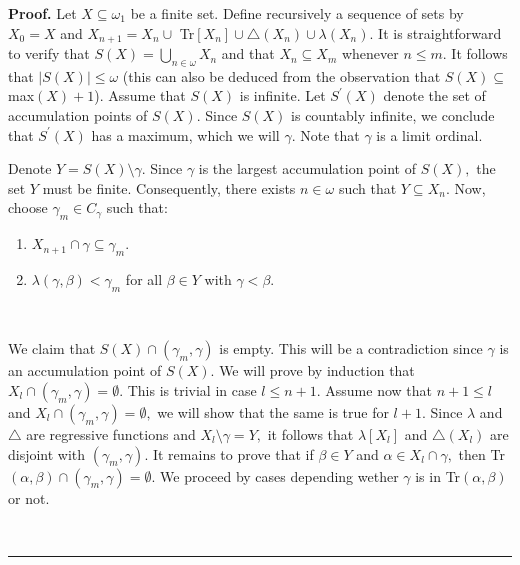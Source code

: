 \documentclass{article}
\newenvironment{proof}[1][Proof]{\noindent\textbf{#1.} }{\ \rule{0.5em}{0.5em}}
\begin{document}
\begin{proof}
Let $X\subseteq\omega_{1}$ be a finite set. Define recursively a sequence of
sets by $X_{0}=X$ and $X_{n+1}=X_{n}\cup$ \textsf{Tr}$\left[  X_{n}\right]
\cup\triangle\left(  X_{n}\right)  \cup\lambda\left(  X_{n}\right)  .$ It is
straightforward to verify that $S\left(  X\right)  =\bigcup\limits_{n\in
\omega}X_{n}$ and that $X_{n}\subseteq X_{m}$ whenever $n\leq m.$ It follows
that $\left\vert S\left(  X\right)  \right\vert \leq\omega$ (this can also be
deduced from the observation that $S\left(  X\right)  \subseteq$
\textsf{max}$\left(  X\right)  +1$). Assume that $S\left(  X\right)  $ is
infinite. Let $S^{\prime}\left(  X\right)  $ denote the set of accumulation
points of $S\left(  X\right)  .$ Since $S\left(  X\right)  $ is countably
infinite, we conclude that $S^{\prime}\left(  X\right)  $ has a maximum, which
we will $\gamma.$ Note that $\gamma$ is a limit ordinal.

\qquad\qquad\qquad\qquad

Denote $Y=S\left(  X\right)  \setminus\gamma.$ Since $\gamma$ is the largest
accumulation point of $S\left(  X\right)  ,$ the set $Y$ must be finite.
Consequently, there exists $n\in\omega$ such that $Y\subseteq X_{n}.$ Now,
choose $\gamma_{m}\in C_{\gamma}$ such that:

\begin{enumerate}
\item $X_{n+1}\cap\gamma\subseteq\gamma_{m}.$

\item $\lambda\left(  \gamma,\beta\right)  <\gamma_{m}$ for all $\beta\in Y$
with $\gamma<\beta.$
\end{enumerate}

\qquad\ \ \qquad\ \ 

We claim that $S\left(  X\right)  \cap\left(  \gamma_{m},\gamma\right)  $ is
empty. This will be a contradiction since $\gamma$ is an accumulation point of
$S\left(  X\right)  .$ We will prove by induction that $X_{l}\cap\left(
\gamma_{m},\gamma\right)  =\emptyset.$ This is trivial in case $l\leq n+1.$
Assume now that $n+1\leq l$ and $X_{l}\cap\left(  \gamma_{m},\gamma\right)
=\emptyset,$ we will show that the same is true for $l+1.$ Since $\lambda$ and
$\triangle$ are regressive functions and $X_{l}\setminus\gamma=Y,$ it follows
that $\lambda\left[  X_{l}\right]  $ and $\triangle\left(  X_{l}\right)  $ are
disjoint with $\left(  \gamma_{m},\gamma\right)  .$ It remains to prove that
if $\beta\in Y$ and $\alpha\in X_{l}\cap\gamma,$ then \textsf{Tr}%
$(\alpha,\beta)\cap\left(  \gamma_{m},\gamma\right)  =\emptyset.$ We proceed
by cases depending wether $\gamma$ is in \textsf{Tr}$(\alpha,\beta)$ or not.


\end{proof}
\end{document}
